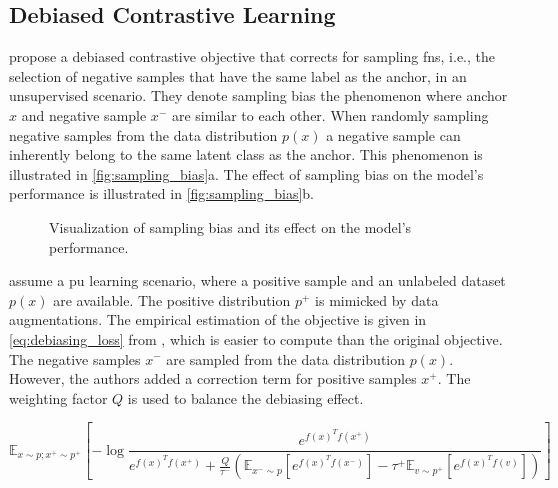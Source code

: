 \subsection{Debiased Contrastive Learning}\label{subsec:debiasing_cl}

\citet{chuang_debiased_2020} propose a debiased contrastive objective that corrects for sampling \acp{fn}, 
i.e., the selection of negative samples that have the same label as the anchor, in an unsupervised scenario.
They denote sampling bias the phenomenon where anchor $x$ and negative sample $x^-$ are similar to each other.
When randomly sampling negative samples from the data distribution $p(x)$ 
a negative sample can inherently belong to the same latent class as the anchor.
This phenomenon is illustrated in \autoref{fig:sampling_bias}a.
The effect of sampling bias on the model's performance is illustrated in \autoref{fig:sampling_bias}b.

\begin{figure}%
    \centering
    \qquad
    \caption{Visualization of sampling bias and its effect on the model's performance.}%
    \label{fig:sampling_bias}%
\end{figure}

\citeauthor{chuang_debiased_2020} assume a \ac{pu} learning scenario, 
where a positive sample and an unlabeled dataset $p(x)$ are available.
The positive distribution $p^+$ is mimicked by data augmentations.
The empirical estimation of the objective is given in 
\autoref{eq:debiasing_loss} from \citet{chuang_debiased_2020},
which is easier to compute than the original objective.
The negative samples $x^-$ are sampled from the data distribution $p(x)$.
However, the authors added a correction term for positive samples $x^+$.
The weighting factor $Q$ is used to balance the debiasing effect.

\begin{equation}
    \mathbb{E}_{x \sim p; x^+ \sim p^+}[{-\log{\frac{e^{f(x)^Tf(x^+)}}{e^{f(x)^Tf(x^+)}+ \frac{Q}{\tau^-}(\mathbb{E}_{x^- \sim p}[e^{f(x)^Tf(x^-)}]-\tau^+\mathbb{E}_{v \sim p^+}[e^{f(x)^Tf(v)}])}}}]
    \label{eq:debiasing_loss}
\end{equation}
